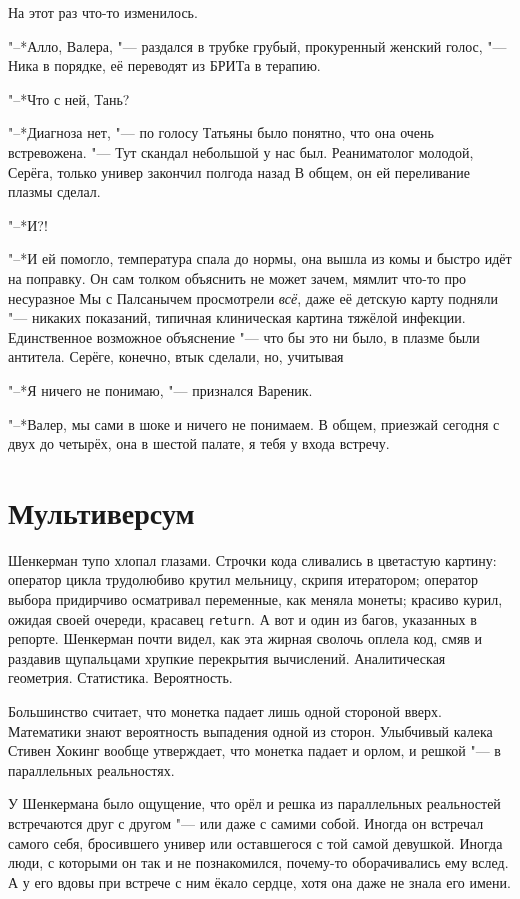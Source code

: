 На этот раз что-то изменилось.

"--*Алло, Валера, "--- раздался в трубке грубый, прокуренный женский голос, "--- Ника в порядке, её переводят из БРИТа в терапию.

"--*Что с ней, Тань?

"--*Диагноза нет, "--- по голосу Татьяны было понятно, что она очень встревожена.
"--- Тут скандал небольшой у нас был.
Реаниматолог молодой, Серёга, только универ закончил полгода назад\ldotst
В общем, он ей переливание плазмы сделал.

"--*И?!

"--*И ей помогло, температура спала до нормы, она вышла из комы и быстро идёт на поправку.
Он сам толком объяснить не может зачем, мямлит что-то про несуразное\ldotst
Мы с Палсанычем просмотрели \emph{всё}, даже её детскую карту подняли "--- никаких показаний, типичная клиническая картина тяжёлой инфекции.
Единственное возможное объяснение "--- что бы это ни было, в плазме были антитела.
Серёге, конечно, втык сделали, но, учитывая\ldotst

"--*Я ничего не понимаю, "--- признался Вареник.

"--*Валер, мы сами в шоке и ничего не понимаем.
В общем, приезжай сегодня с двух до четырёх, она в шестой палате, я тебя у входа встречу.

\section{Мультиверсум}

Шенкерман тупо хлопал глазами.
Строчки кода сливались в цветастую картину: оператор цикла трудолюбиво крутил мельницу, скрипя итератором;
оператор выбора придирчиво осматривал переменные, как меняла монеты;
красиво курил, ожидая своей очереди, красавец \verb|return|.
А вот и один из багов, указанных в репорте.
Шенкерман почти видел, как эта жирная сволочь оплела код, смяв и раздавив щупальцами хрупкие перекрытия вычислений.
Аналитическая геометрия.
Статистика.
Вероятность.

Большинство считает, что монетка падает лишь одной стороной вверх.
Математики знают вероятность выпадения одной из сторон.
Улыбчивый калека Стивен Хокинг вообще утверждает, что монетка падает и орлом, и решкой "--- в параллельных реальностях.

У Шенкермана было ощущение, что орёл и решка из параллельных реальностей встречаются друг с другом "--- или даже с самими собой.
Иногда он встречал самого себя, бросившего универ или оставшегося с той самой девушкой.
Иногда люди, с которыми он так и не познакомился, почему-то оборачивались ему вслед.
А у его вдовы при встрече с ним ёкало сердце, хотя она даже не знала его имени.

